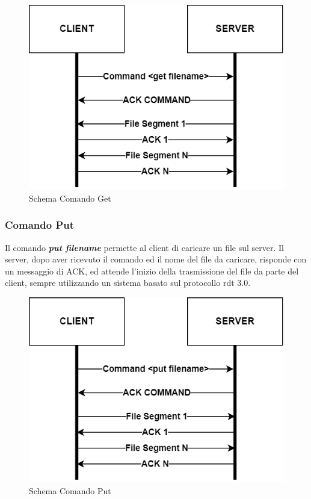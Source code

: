 \documentclass{article}
\begin{document}
\begin{figure}[!htb]
  \includegraphics[width=\linewidth]{commandGet.png}
  \caption{Schema Comando Get}
\end{figure}

\subsubsection{Comando Put}


Il comando \textbf{\emph{put filename}} permette al client di caricare un file sul server. Il server, dopo aver ricevuto il comando ed il nome del file da caricare, risponde con un messaggio di ACK,
ed attende l'inizio della trasmissione del file da parte del client, sempre utilizzando un sistema basato sul protocollo rdt 3.0.

\begin{figure}[!htb]
  \includegraphics[width=\linewidth]{commandPut.png}
  \caption{Schema Comando Put}
\end{figure}
\end{document}
